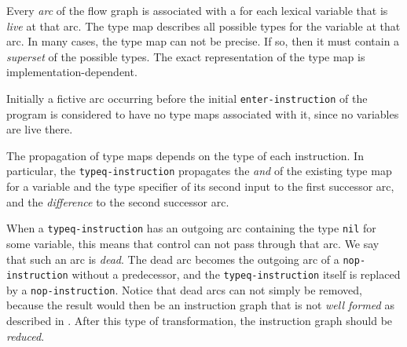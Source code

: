 Every \emph{arc} of the flow graph is associated with a  for each lexical variable that is \emph{live} at that arc.  The
type map describes all possible types for the variable at that arc.
In many cases, the type map can not be precise.  If so, then it must
contain a \emph{superset} of the possible types.  The exact
representation of the type map is implementation-dependent. 

Initially a fictive arc occurring before the initial
\texttt{enter-instruction} of the program is considered to have no
type maps associated with it, since no variables are live there.  

The propagation of type maps depends on the type of each instruction.
In particular, the \texttt{typeq-instruction} propagates the
\emph{and} of the existing type map for a variable and the type
specifier of its second input to the first successor arc, and the
\emph{difference} to the second successor arc.  

When a \texttt{typeq-instruction} has an outgoing arc containing the
type \texttt{nil} for some variable, this means that control can not
pass through that arc.  We say that such an arc is \emph{dead}. 
The dead arc becomes the outgoing arc of a
\texttt{nop-instruction} without a predecessor, and the
\texttt{typeq-instruction} itself is replaced by a
\texttt{nop-instruction}.%
Notice that dead arcs can not simply be removed, because the result
would then be an instruction graph that is not \emph{well formed} as
described in .  After this type of transformation,
the instruction graph should be
\emph{reduced}.  
